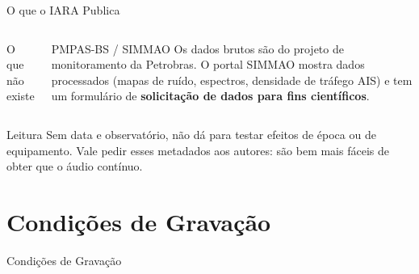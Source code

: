 \documentclass[aspectratio=169]{beamer}
\begin{document}
\begin{frame}{O que o IARA Publica}
\begin{columns}[t]
\begin{alertblock}{\small O que não existe}
        \end{alertblock}
        \begin{block}{\small PMPAS-BS / SIMMAO}
            \scriptsize
            Os dados brutos são do projeto de monitoramento da Petrobras. O portal SIMMAO mostra dados processados (mapas de ruído, espectros, densidade de tráfego AIS) e tem um formulário de \textbf{solicitação de dados para fins científicos}.
        \end{block}
    \end{columns}
    \begin{alertblock}{Leitura}
        \scriptsize
        Sem data e observatório, não dá para testar efeitos de época ou de equipamento. Vale pedir esses metadados aos autores: são bem mais fáceis de obter que o áudio contínuo.
    \end{alertblock}
\end{frame}

\section{Condições de Gravação}

\begin{frame}
    \centering
    \huge Condições de Gravação
\end{frame}
\end{document}
